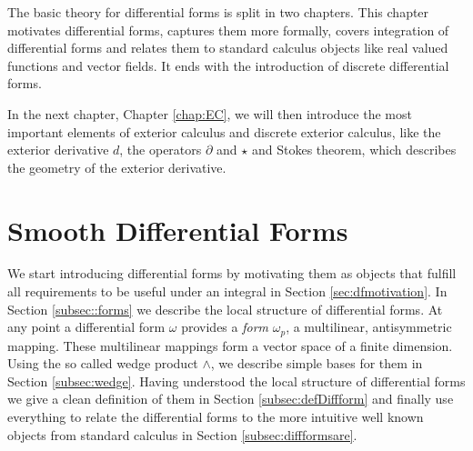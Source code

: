 The basic theory for differential forms is split in two chapters. This chapter motivates differential forms, captures them more formally, covers integration of differential forms and relates them to standard calculus objects like real valued functions  and vector fields. It ends with the introduction of discrete differential forms.

In the next chapter, Chapter \ref{chap:EC}, we will then introduce the most important elements of exterior calculus and discrete exterior calculus, like the exterior derivative $d$, the operators $\partial$ and $\star$ and Stokes theorem, which describes the geometry of the exterior derivative.

\section{Smooth Differential Forms}

We start introducing differential forms by motivating them as objects that fulfill all requirements to be useful under an integral in Section \ref{sec:dfmotivation}. In Section \ref{subsec::forms} we describe the  local structure of differential forms. At any point a differential form $\omega$ provides a \emph{form} $\omega_p$, a multilinear, antisymmetric mapping. These multilinear mappings form a vector space of a finite dimension. Using the so called wedge product $\wedge$, we describe simple bases for them in Section \ref{subsec:wedge}. Having understood the local structure of differential forms we give a clean definition of them in Section \ref{subsec:defDiffform} and finally use everything to relate the differential forms to the more intuitive well known objects from standard calculus in Section \ref{subsec:diffformsare}.

